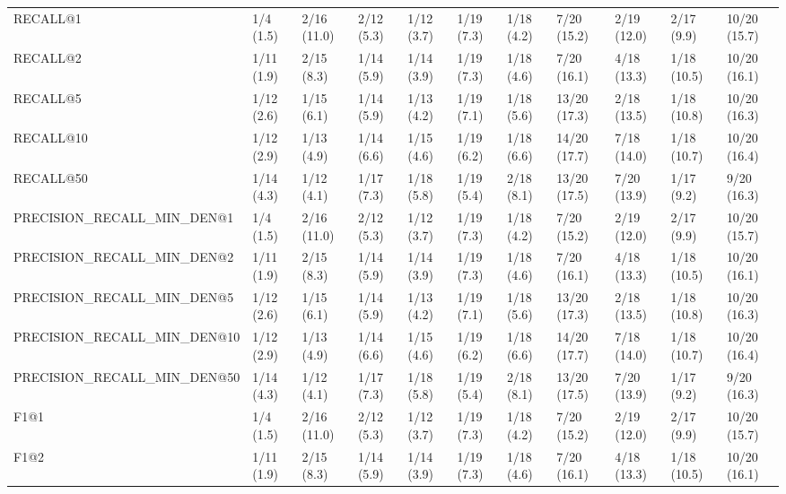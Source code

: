 \begin{tabular}{lllllllllll}
RECALL@1                    &      1/4 (1.5) &    2/16 (11.0) &    2/12 (5.3) &    1/12 (3.7) &  1/19 (7.3) &   1/18 (4.2) &    7/20 (15.2) &         2/19 (12.0) &   2/17 (9.9) &  10/20 (15.7) \\
RECALL@2                    &     1/11 (1.9) &     2/15 (8.3) &    1/14 (5.9) &    1/14 (3.9) &  1/19 (7.3) &   1/18 (4.6) &    7/20 (16.1) &         4/18 (13.3) &  1/18 (10.5) &  10/20 (16.1) \\
RECALL@5                    &     1/12 (2.6) &     1/15 (6.1) &    1/14 (5.9) &    1/13 (4.2) &  1/19 (7.1) &   1/18 (5.6) &   13/20 (17.3) &         2/18 (13.5) &  1/18 (10.8) &  10/20 (16.3) \\
RECALL@10                   &     1/12 (2.9) &     1/13 (4.9) &    1/14 (6.6) &    1/15 (4.6) &  1/19 (6.2) &   1/18 (6.6) &   14/20 (17.7) &         7/18 (14.0) &  1/18 (10.7) &  10/20 (16.4) \\
RECALL@50                   &     1/14 (4.3) &     1/12 (4.1) &    1/17 (7.3) &    1/18 (5.8) &  1/19 (5.4) &   2/18 (8.1) &   13/20 (17.5) &         7/20 (13.9) &   1/17 (9.2) &   9/20 (16.3) \\
PRECISION_RECALL_MIN_DEN@1  &      1/4 (1.5) &    2/16 (11.0) &    2/12 (5.3) &    1/12 (3.7) &  1/19 (7.3) &   1/18 (4.2) &    7/20 (15.2) &         2/19 (12.0) &   2/17 (9.9) &  10/20 (15.7) \\
PRECISION_RECALL_MIN_DEN@2  &     1/11 (1.9) &     2/15 (8.3) &    1/14 (5.9) &    1/14 (3.9) &  1/19 (7.3) &   1/18 (4.6) &    7/20 (16.1) &         4/18 (13.3) &  1/18 (10.5) &  10/20 (16.1) \\
PRECISION_RECALL_MIN_DEN@5  &     1/12 (2.6) &     1/15 (6.1) &    1/14 (5.9) &    1/13 (4.2) &  1/19 (7.1) &   1/18 (5.6) &   13/20 (17.3) &         2/18 (13.5) &  1/18 (10.8) &  10/20 (16.3) \\
PRECISION_RECALL_MIN_DEN@10 &     1/12 (2.9) &     1/13 (4.9) &    1/14 (6.6) &    1/15 (4.6) &  1/19 (6.2) &   1/18 (6.6) &   14/20 (17.7) &         7/18 (14.0) &  1/18 (10.7) &  10/20 (16.4) \\
PRECISION_RECALL_MIN_DEN@50 &     1/14 (4.3) &     1/12 (4.1) &    1/17 (7.3) &    1/18 (5.8) &  1/19 (5.4) &   2/18 (8.1) &   13/20 (17.5) &         7/20 (13.9) &   1/17 (9.2) &   9/20 (16.3) \\
F1@1                        &      1/4 (1.5) &    2/16 (11.0) &    2/12 (5.3) &    1/12 (3.7) &  1/19 (7.3) &   1/18 (4.2) &    7/20 (15.2) &         2/19 (12.0) &   2/17 (9.9) &  10/20 (15.7) \\
F1@2                        &     1/11 (1.9) &     2/15 (8.3) &    1/14 (5.9) &    1/14 (3.9) &  1/19 (7.3) &   1/18 (4.6) &    7/20 (16.1) &         4/18 (13.3) &  1/18 (10.5) &  10/20 (16.1) \\

\end{tabular}
